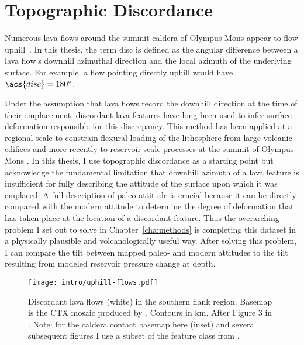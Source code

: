\section{Topographic Discordance}\label{sec:discordance}

Numerous lava flows around the summit caldera of Olympus Mons appear to flow uphill~\parencite[Figure~\ref{fig:uphill-flows}; after][]{mouginis-mark_late-stage_2019}. In this thesis, the term \ac{disc} is defined as the angular difference between a lava flow's downhill azimuthal direction and the local azimuth of the underlying surface. For example, a flow pointing directly uphill would have $\acs{disc}=\ang{180}$. 

Under the assumption that lava flows record the downhill direction at the time of their emplacement, discordant lava features have long been used to infer surface deformation responsible for this discrepancy. This method has been applied at a regional scale to constrain flexural loading of the lithosphere from large volcanic edifices \parencite{mouginis-mark_ancient_1982,isherwood_volcanic_2013,chadwick_late_2015} and more recently to reservoir-scale processes at the summit of Olympus Mons \parencite{mouginis-mark_late-stage_2019}. In this thesis, I use topographic discordance as a starting point but acknowledge the fundamental limitation that downhill azimuth of a lava feature is insufficient for fully describing the attitude of the surface upon which it was emplaced. A full description of paleo-attitude is crucial because it can be directly compared with the modern attitude to determine the degree of deformation that has taken place at the location of a discordant feature. Thus the overarching problem I set out to solve in Chapter~\ref{cha:methods} is completing this dataset in a physically plausible and volcanologically useful way. After solving this problem, I can compare the tilt between mapped paleo- and modern attitudes to the tilt resulting from modeled reservoir pressure change at depth.

\begin{figure}
    \centering
    \texttt{[image: intro/uphill-flows.pdf]}
    \caption[Discordant lava flows]{Discordant lava flows (white) in the southern flank region. Basemap is the \acf{CTX} mosaic produced by \textcite{Dickson2018AGB}. Contours in \unit{\km}. After Figure 3 in \textcite{mouginis-mark_late-stage_2019}. Note: for the caldera contact basemap here (inset) and several subsequent figures I use a subset of the feature class from \textcite{mouginis-mark_geologic_2021}.}%
    \label{fig:uphill-flows}
\end{figure}

